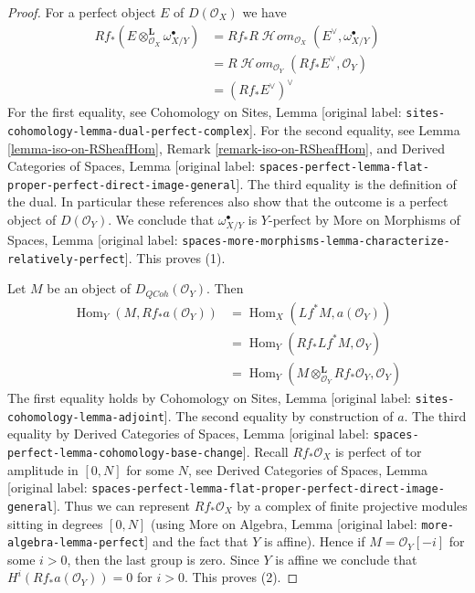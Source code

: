 \documentclass[10pt,a4paper]{article}
\theoremstyle{plain}
\theoremstyle{definition}
\theoremstyle{remark}
\numberwithin{equation}{subsection}
\def\Hom{\mathop{\mathrm{Hom}}\nolimits}
\def\SheafHom{\mathop{\mathcal{H}\!\mathit{om}}\nolimits}
\def\QCoh{\mathit{QCoh}}
\begin{document}
\begin{proof}
For a perfect object $E$ of $D(\mathcal{O}_X)$ we have
\begin{align*}
Rf_*(E \otimes_{\mathcal{O}_X}^\mathbf{L} \omega_{X/Y}^\bullet)
& =
Rf_*R\SheafHom_{\mathcal{O}_X}(E^\vee, \omega_{X/Y}^\bullet) \\
& =
R\SheafHom_{\mathcal{O}_Y}(Rf_*E^\vee, \mathcal{O}_Y) \\
& =
(Rf_*E^\vee)^\vee
\end{align*}
For the first equality, see
Cohomology on Sites, Lemma \textnormal{[original label: \nolinkurl{sites-cohomology-lemma-dual-perfect-complex}]}.
For the second equality, see Lemma \ref{lemma-iso-on-RSheafHom},
Remark \ref{remark-iso-on-RSheafHom}, and 
Derived Categories of Spaces, Lemma
\textnormal{[original label: \nolinkurl{spaces-perfect-lemma-flat-proper-perfect-direct-image-general}]}.
The third equality is the definition of the dual. In particular
these references also show that the outcome is a perfect object
of $D(\mathcal{O}_Y)$. We conclude that $\omega_{X/Y}^\bullet$
is $Y$-perfect by More on Morphisms of Spaces, Lemma
\textnormal{[original label: \nolinkurl{spaces-more-morphisms-lemma-characterize-relatively-perfect}]}.
This proves (1).

\medskip\noindent
Let $M$ be an object of $D_\QCoh(\mathcal{O}_Y)$. Then
\begin{align*}
\Hom_Y(M, Rf_*a(\mathcal{O}_Y)) & =
\Hom_X(Lf^*M, a(\mathcal{O}_Y)) \\
& =
\Hom_Y(Rf_*Lf^*M, \mathcal{O}_Y) \\
& =
\Hom_Y(M \otimes_{\mathcal{O}_Y}^\mathbf{L} Rf_*\mathcal{O}_Y, \mathcal{O}_Y)
\end{align*}
The first equality holds by Cohomology on Sites, Lemma
\textnormal{[original label: \nolinkurl{sites-cohomology-lemma-adjoint}]}.
The second equality by construction of $a$.
The third equality by Derived Categories of Spaces, Lemma
\textnormal{[original label: \nolinkurl{spaces-perfect-lemma-cohomology-base-change}]}.
Recall $Rf_*\mathcal{O}_X$ is perfect of tor amplitude in $[0, N]$
for some $N$, see
Derived Categories of Spaces, Lemma
\textnormal{[original label: \nolinkurl{spaces-perfect-lemma-flat-proper-perfect-direct-image-general}]}.
Thus we can represent $Rf_*\mathcal{O}_X$ by a complex of
finite projective modules sitting in degrees $[0, N]$
(using More on Algebra, Lemma \textnormal{[original label: \nolinkurl{more-algebra-lemma-perfect}]}
and the fact that $Y$ is affine).
Hence if $M = \mathcal{O}_Y[-i]$ for some $i > 0$, then the last
group is zero. Since $Y$ is affine we conclude that
$H^i(Rf_*a(\mathcal{O}_Y)) = 0$ for $i > 0$.
This proves (2).


\end{proof}
\end{document}
